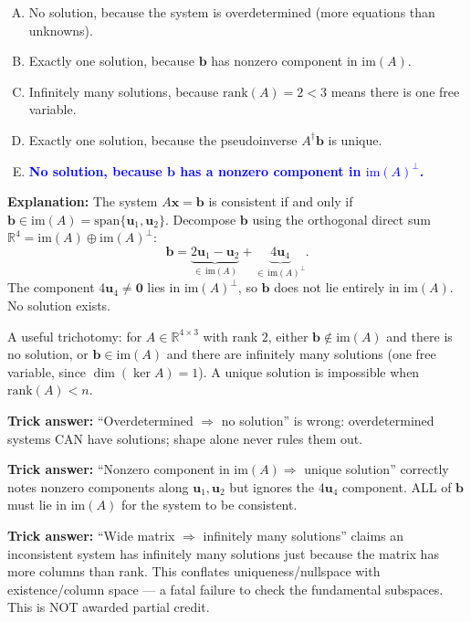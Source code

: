 \documentclass[12pt]{amsart}
\begin{document}
\begin{enumerate}[(A)]
\item No solution, because the system is overdetermined (more equations than unknowns).
\item Exactly one solution, because $\mathbf{b}$ has nonzero component in $\mathrm{im}(A)$.
\item Infinitely many solutions, because $\mathrm{rank}(A) = 2 < 3$ means there is one free variable.
\item Exactly one solution, because the pseudoinverse $A^\dagger\mathbf{b}$ is unique.
\item \textcolor{blue}{\textbf{No solution, because $\mathbf{b}$ has a nonzero component in $\mathrm{im}(A)^\perp$.}}
\end{enumerate}

\textbf{Explanation:}
The system $A\mathbf{x} = \mathbf{b}$ is consistent if and only if
$\mathbf{b} \in \mathrm{im}(A) = \mathrm{span}\{\mathbf{u}_1, \mathbf{u}_2\}$.
Decompose $\mathbf{b}$ using the orthogonal direct sum
$\mathbb{R}^4 = \mathrm{im}(A) \oplus \mathrm{im}(A)^\perp$:
$$\mathbf{b} = \underbrace{2\mathbf{u}_1 - \mathbf{u}_2}_{\in\,\mathrm{im}(A)}
+ \underbrace{4\mathbf{u}_4}_{\in\,\mathrm{im}(A)^\perp}.$$
The component $4\mathbf{u}_4 \neq \mathbf{0}$ lies in $\mathrm{im}(A)^\perp$,
so $\mathbf{b}$ does not lie entirely in $\mathrm{im}(A)$. No solution exists.

A useful trichotomy: for $A \in \mathbb{R}^{4 \times 3}$ with rank $2$, either
$\mathbf{b} \notin \mathrm{im}(A)$ and there is no solution, or
$\mathbf{b} \in \mathrm{im}(A)$ and there are infinitely many solutions
(one free variable, since $\dim(\ker A) = 1$). A unique solution is impossible
when $\mathrm{rank}(A) < n$.

\textbf{Trick answer:}
``Overdetermined $\Rightarrow$ no solution'' is wrong: overdetermined systems
CAN have solutions; shape alone never rules them out.

\textbf{Trick answer:}
``Nonzero component in $\mathrm{im}(A) \Rightarrow$ unique solution'' correctly
notes nonzero components along $\mathbf{u}_1, \mathbf{u}_2$ but ignores the
$4\mathbf{u}_4$ component. ALL of $\mathbf{b}$ must lie in $\mathrm{im}(A)$
for the system to be consistent.

\textbf{Trick answer:}
``Wide matrix $\Rightarrow$ infinitely many solutions'' claims an inconsistent
system has infinitely many solutions just because the matrix has more columns
than rank. This conflates uniqueness/nullspace with existence/column space ---
a fatal failure to check the fundamental subspaces.
This is NOT awarded partial credit.
\end{document}
